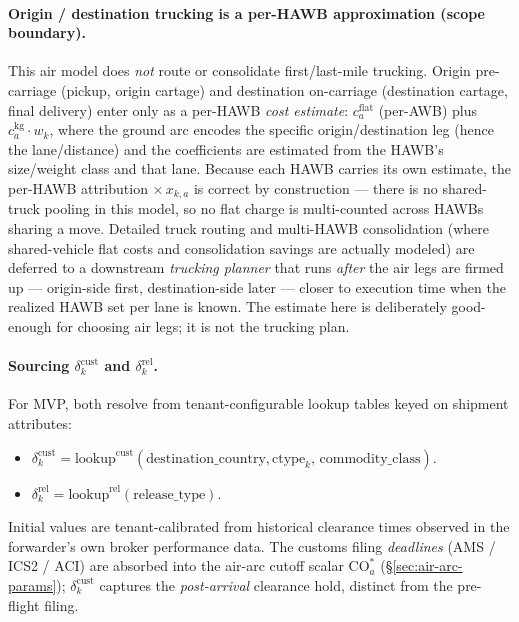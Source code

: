 \documentclass[11pt,a4paper]{article}
\newcommand{\ctype}{\text{ctype}}
\theoremstyle{definition}
\begin{document}
\paragraph{Origin / destination trucking is a per-HAWB approximation (scope boundary).}
This air model does \emph{not} route or consolidate first/last-mile trucking.
Origin pre-carriage (pickup, origin cartage) and destination on-carriage
(destination cartage, final delivery) enter only as a per-HAWB \emph{cost
estimate}: $c_a^{\text{flat}}$ (per-AWB) plus $c_a^{\text{kg}} \cdot w_k$, where
the ground arc encodes the specific origin/destination leg (hence the
lane/distance) and the coefficients are estimated from the HAWB's size/weight
class and that lane. Because each HAWB carries its own estimate, the per-HAWB
attribution $\times\, x_{k,a}$ is correct by construction --- there is no
shared-truck pooling in this model, so no flat charge is multi-counted across
HAWBs sharing a move. Detailed truck routing and multi-HAWB consolidation
(where shared-vehicle flat costs and consolidation savings are actually
modeled) are deferred to a downstream \emph{trucking planner} that runs
\emph{after} the air legs are firmed up --- origin-side first, destination-side
later --- closer to execution time when the realized HAWB set per lane is
known. The estimate here is deliberately good-enough for choosing air legs; it
is not the trucking plan.

\paragraph{Sourcing $\delta^{\text{cust}}_k$ and $\delta^{\text{rel}}_k$.}
For MVP, both resolve from tenant-configurable lookup tables keyed on
shipment attributes:
\begin{itemize}[noitemsep]
  \item $\delta^{\text{cust}}_k = \text{lookup}^{\text{cust}}(\text{destination\_country},
        \ctype_k,\, \text{commodity\_class})$.
  \item $\delta^{\text{rel}}_k = \text{lookup}^{\text{rel}}(\text{release\_type})$.
\end{itemize}
Initial values are tenant-calibrated from historical clearance times observed
in the forwarder's own broker performance data. The customs filing
\emph{deadlines} (AMS / ICS2 / ACI) are absorbed into the air-arc cutoff
scalar $\text{CO}_a^*$ (\S\ref{sec:air-arc-params}); $\delta^{\text{cust}}_k$
captures the \emph{post-arrival} clearance hold, distinct from the pre-flight
filing.
\end{document}
